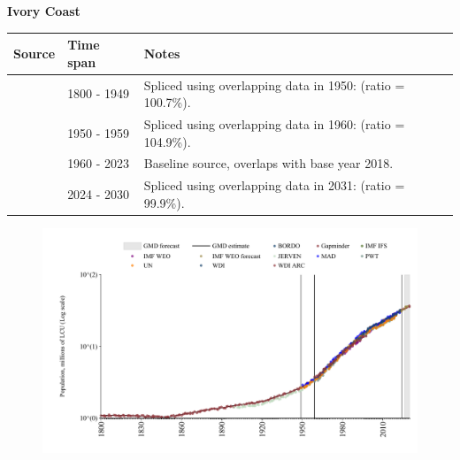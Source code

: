 \documentclass[12pt,a4paper,landscape]{article}
\begin{document}
\begin{adjustbox}{max totalsize={\paperwidth}{\paperheight},center}
\begin{minipage}[t][\textheight][t]{\textwidth}
\vspace*{0.5cm}
{}
\begin{center}
{\Large\bfseries Ivory Coast}
\end{center}
\vspace{0.5cm}
\begin{table}[H]
\centering
\small
\begin{tabular}{|l|l|l|}
\hline
\textbf{Source} & \textbf{Time span} & \textbf{Notes} \\
\hline
\rowcolor{white}\cite{Gapminder}& 1800 - 1949 &Spliced using overlapping data in 1950: (ratio = 100.7\%).\\
\rowcolor{lightgray}\cite{IMF_IFS}& 1950 - 1959 &Spliced using overlapping data in 1960: (ratio = 104.9\%).\\
\rowcolor{white}\cite{WDI}& 1960 - 2023 &Baseline source, overlaps with base year 2018.\\
\rowcolor{lightgray}\cite{Gapminder}& 2024 - 2030 &Spliced using overlapping data in 2031: (ratio = 99.9\%).\\
\hline
\end{tabular}
\end{table}
\begin{figure}[H]
\centering
\includegraphics[width=\textwidth,height=0.6\textheight,keepaspectratio]{graphs/CIV_pop.pdf}
\end{figure}
\end{minipage}
\end{adjustbox}
\end{document}
